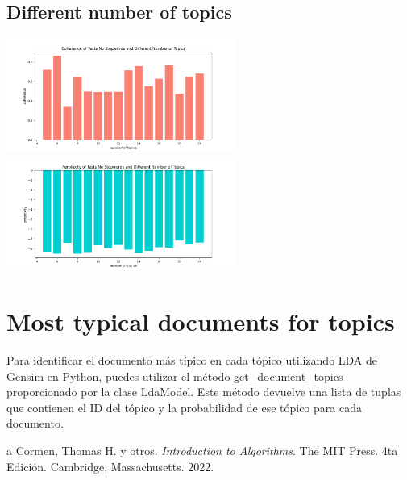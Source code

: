 \documentclass[10pt]{article} %
\begin{document}
	\subsection{Different number of topics}
	\begin{center}
		\includegraphics[width=7.5cm]{images/coherence_no_stopwords_diff_n_topics_2}
		\includegraphics[width=7.5cm]{images/perplexity_no_stopwords_diff_n_topics_2}
	\end{center}
	
	\section{Most typical documents for topics}
	Para identificar el documento más típico en cada tópico utilizando LDA de Gensim en Python, puedes utilizar el método get\_document\_topics proporcionado por la clase LdaModel. Este método devuelve una lista de tuplas que contienen el ID del tópico y la probabilidad de ese tópico para cada documento.
	
	
	
	\begin{thebibliography}
		a
		 Cormen, Thomas H. y otros. \emph{Introduction to Algorithms}. 
		The MIT Press.
		4ta Edici\'on.		
		Cambridge, Massachusetts.
		2022.
	\end{thebibliography}
\end{document}
